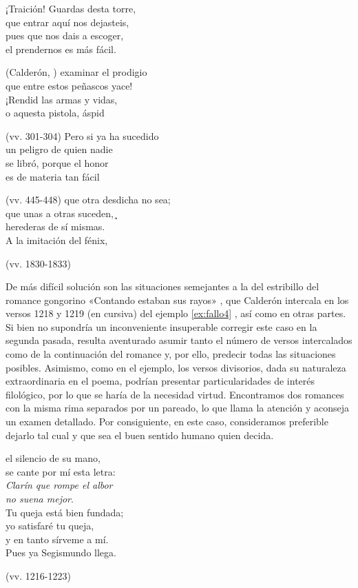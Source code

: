 \begin{exe}
	\ex\label{ex:fallo1}¡Traición! Guardas desta torre,\\
	que entrar aquí nos dejasteis,\\
	pues que nos dais a escoger,\\
	el prendernos es más fácil.\strut\hfill(Calderón, )
	\ex\label{ex:fallo2}examinar el prodigio\\
	que entre estos peñascos yace!\\
	¡Rendid las armas y vidas,\\
	o aquesta pistola, áspid\strut\hfill(vv. 301-304)
	\ex\label{ex:fallo3}Pero si ya ha sucedido\\
	un peligro de quien nadie\\
	se libró, porque el honor\\	
	es de materia tan fácil\strut\hfill(vv. 445-448)
	\ex\label{ex:fallo6}que otra desdicha no sea;\\	
	que unas a otras suceden,¸\\	
	herederas de sí mismas.\\
	A la imitación del fénix,\strut\hfill(vv. 1830-1833)
\end{exe}

De más difícil solución son las situaciones semejantes a la del estribillo del romance gongorino «Contando estaban sus rayos» \parencite[n.° 72]{gongora1966}, que Calderón intercala en los versos 1218 y 1219 (en cursiva) del ejemplo \ref{ex:fallo4} , así como en otras partes. Si bien no supondría un inconveniente insuperable corregir este caso en la segunda pasada, resulta aventurado asumir tanto el número de versos intercalados como de la continuación del romance y, por ello, predecir todas las situaciones posibles. Asimismo, como en el ejemplo, los versos divisorios, dada su naturaleza extraordinaria en el poema, podrían presentar particularidades de interés filológico, por lo que se haría de la necesidad virtud. Encontramos dos romances con la misma rima separados por un pareado, lo que llama la atención y aconseja un examen detallado. Por consiguiente, en este caso, consideramos preferible dejarlo tal cual y que sea el buen sentido humano quien decida.

\begin{exe}
	\ex\label{ex:fallo4}el silencio de su mano,\\
	se cante por mí esta letra:\\
	\textit{Clarín que rompe el albor}\\
	\textit{no suena mejor}.\\
	Tu queja está bien fundada;\\	
	yo satisfaré tu queja,\\
	y en tanto sírveme a mí.\\	
	Pues ya Segismundo llega.\strut\hfill(vv. 1216-1223)
\end{exe}


